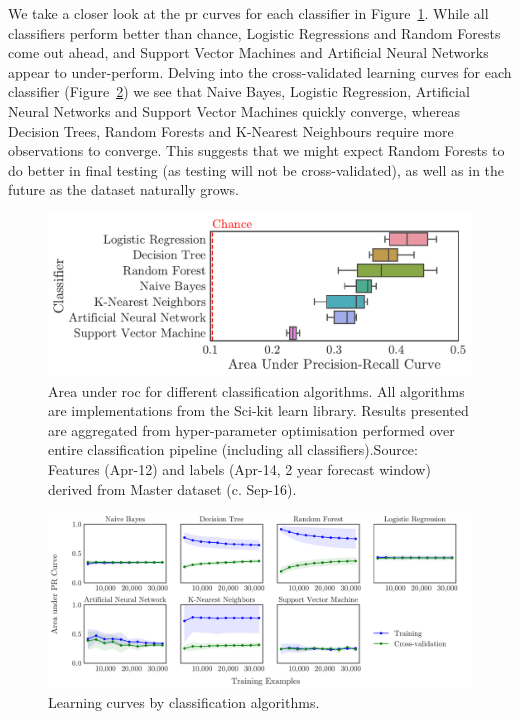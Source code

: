 \documentclass[../thesis/thesis.tex]{subfiles}
\begin{document}
We take a closer look at the \gls{pr} curves for each classifier in Figure~\ref{fig:design:classifier}. While all classifiers perform better than chance, Logistic Regressions and Random Forests come out ahead, and Support Vector Machines and Artificial Neural Networks appear to under-perform. Delving into the cross-validated learning curves for each classifier (Figure~\ref{fig:design:create_learning_curves}) we see that Naive Bayes, Logistic Regression, Artificial Neural Networks and Support Vector Machines quickly converge, whereas Decision Trees, Random Forests and K-Nearest Neighbours require more observations to converge. This suggests that we might expect Random Forests to do better in final testing (as testing will not be cross-validated), as well as in the future as the dataset naturally grows.

\begin{figure}[!htb]
    \centering
    \includegraphics[width=\textwidth]{../figures/design/auc_classifier}
    \caption[Area under PR Curves by classification algorithms]{Area under \gls{roc} for different classification algorithms. All algorithms are implementations from the Sci-kit learn library. Results presented are aggregated from hyper-parameter optimisation performed over entire classification pipeline (including all classifiers).Source: Features (Apr-12) and labels (Apr-14, 2 year forecast window) derived from Master dataset (c. Sep-16).}
    \label{fig:design:classifier}
\end{figure}

\begin{figure}[!htb]
    \centering
    \includegraphics[width=\textwidth]{../figures/design/learning_curves_classifier}
    \caption[Learning curves by classification algorithms]{Learning curves by classification algorithms.}
    \label{fig:design:create_learning_curves}
\end{figure}
\end{document}
